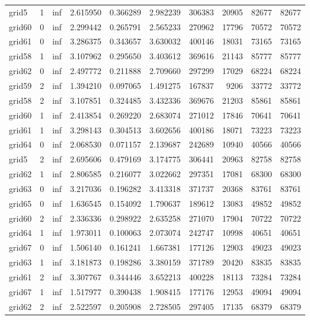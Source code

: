 \begin{longtable}{|l|r|r|r|r|r|r|r|r|r|}
grid5 & 1 & inf & 2.615950 & 0.366289 & 2.982239 & 306383 & 20905 & 82677 & 82677 \\
grid60 & 0 & inf & 2.299442 & 0.265791 & 2.565233 & 270962 & 17796 & 70572 & 70572 \\
grid61 & 0 & inf & 3.286375 & 0.343657 & 3.630032 & 400146 & 18031 & 73165 & 73165 \\
grid58 & 1 & inf & 3.107962 & 0.295650 & 3.403612 & 369616 & 21143 & 85777 & 85777 \\
grid62 & 0 & inf & 2.497772 & 0.211888 & 2.709660 & 297299 & 17029 & 68224 & 68224 \\
grid59 & 2 & inf & 1.394210 & 0.097065 & 1.491275 & 167837 & 9206 & 33772 & 33772 \\
grid58 & 2 & inf & 3.107851 & 0.324485 & 3.432336 & 369676 & 21203 & 85861 & 85861 \\
grid60 & 1 & inf & 2.413854 & 0.269220 & 2.683074 & 271012 & 17846 & 70641 & 70641 \\
grid61 & 1 & inf & 3.298143 & 0.304513 & 3.602656 & 400186 & 18071 & 73223 & 73223 \\
grid64 & 0 & inf & 2.068530 & 0.071157 & 2.139687 & 242689 & 10940 & 40566 & 40566 \\
grid5 & 2 & inf & 2.695606 & 0.479169 & 3.174775 & 306441 & 20963 & 82758 & 82758 \\
grid62 & 1 & inf & 2.806585 & 0.216077 & 3.022662 & 297351 & 17081 & 68300 & 68300 \\
grid63 & 0 & inf & 3.217036 & 0.196282 & 3.413318 & 371737 & 20368 & 83761 & 83761 \\
grid65 & 0 & inf & 1.636545 & 0.154092 & 1.790637 & 189612 & 13083 & 49852 & 49852 \\
grid60 & 2 & inf & 2.336336 & 0.298922 & 2.635258 & 271070 & 17904 & 70722 & 70722 \\
grid64 & 1 & inf & 1.973011 & 0.100063 & 2.073074 & 242747 & 10998 & 40651 & 40651 \\
grid67 & 0 & inf & 1.506140 & 0.161241 & 1.667381 & 177126 & 12903 & 49023 & 49023 \\
grid63 & 1 & inf & 3.181873 & 0.198286 & 3.380159 & 371789 & 20420 & 83835 & 83835 \\
grid61 & 2 & inf & 3.307767 & 0.344446 & 3.652213 & 400228 & 18113 & 73284 & 73284 \\
grid67 & 1 & inf & 1.517977 & 0.390438 & 1.908415 & 177176 & 12953 & 49094 & 49094 \\
grid62 & 2 & inf & 2.522597 & 0.205908 & 2.728505 & 297405 & 17135 & 68379 & 68379 \\

\end{longtable}
